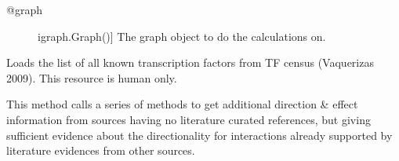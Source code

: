 \documentclass[letterpaper,10pt,english]{sphinxmanual}
\begin{document}
\begin{fulllineitems}
\begin{fulllineitems}
\begin{description}
\item[{@graph}] \leavevmode{[}igraph.Graph(){]}
The graph object to do the calculations on.

\end{description}

\end{fulllineitems}


\begin{fulllineitems}
\label{\detokenize{main:pypath.main.PyPath.table_latex}}
\end{fulllineitems}


\begin{fulllineitems}
\label{\detokenize{main:pypath.main.PyPath.tfs_list}}
Loads the list of all known transcription factors from TF census
(Vaquerizas 2009). This resource is human only.

\end{fulllineitems}


\begin{fulllineitems}
\label{\detokenize{main:pypath.main.PyPath.third_source_directions}}
This method calls a series of methods to get
additional direction \& effect information
from sources having no literature curated references,
but giving sufficient evidence about the directionality
for interactions already supported by literature
evidences from other sources.

\end{fulllineitems}



\end{fulllineitems}
\end{document}
